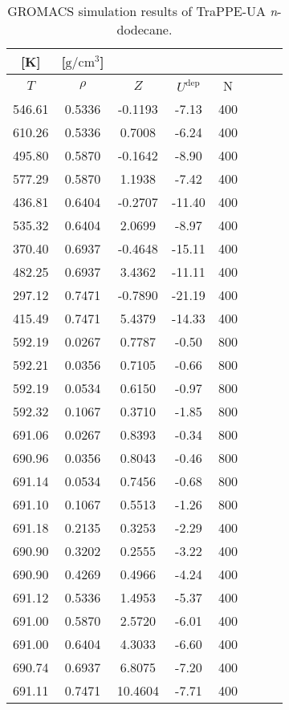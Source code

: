 \documentclass[%
 aip,
 jcp,
 sd,%
 amsmath,amssymb,
]{revtex4-1}
\begin{document}
\begin{table*}[!htbp]
\centering
\caption{GROMACS simulation results of TraPPE-UA \textit{n}-dodecane.}
\label{tab:sim-res-TraPPE-C12-gmx}
\begin{ruledtabular}
\begin{tabular}{cccccccc}
[K] & [$\mathrm{g/cm^3}$] &  &  & \\
\hline
$T$ & $\rho$ & $Z$ & $U^{\mathrm{dep}}$ & N\\
\hline
546.61	&	0.5336	&	-0.1193	&	-7.13	&	400	\\
610.26	&	0.5336	&	0.7008	&	-6.24	&	400	\\
495.80	&	0.5870	&	-0.1642	&	-8.90	&	400	\\
577.29	&	0.5870	&	1.1938	&	-7.42	&	400	\\
436.81	&	0.6404	&	-0.2707	&	-11.40	&	400	\\
535.32	&	0.6404	&	2.0699	&	-8.97	&	400	\\
370.40	&	0.6937	&	-0.4648	&	-15.11	&	400	\\
482.25	&	0.6937	&	3.4362	&	-11.11	&	400	\\
297.12	&	0.7471	&	-0.7890	&	-21.19	&	400	\\
415.49	&	0.7471	&	5.4379	&	-14.33	&	400	\\
592.19	&	0.0267	&	0.7787	&	-0.50	&	800	\\
592.21	&	0.0356	&	0.7105	&	-0.66	&	800	\\
592.19	&	0.0534	&	0.6150	&	-0.97	&	800	\\
592.32	&	0.1067	&	0.3710	&	-1.85	&	800	\\
691.06	&	0.0267	&	0.8393	&	-0.34	&	800	\\
690.96	&	0.0356	&	0.8043	&	-0.46	&	800	\\
691.14	&	0.0534	&	0.7456	&	-0.68	&	800	\\
691.10	&	0.1067	&	0.5513	&	-1.26	&	800	\\
691.18	&	0.2135	&	0.3253	&	-2.29	&	400	\\
690.90	&	0.3202	&	0.2555	&	-3.22	&	400	\\
690.90	&	0.4269	&	0.4966	&	-4.24	&	400	\\
691.12	&	0.5336	&	1.4953	&	-5.37	&	400	\\
691.00	&	0.5870	&	2.5720	&	-6.01	&	400	\\
691.00	&	0.6404	&	4.3033	&	-6.60	&	400	\\
690.74	&	0.6937	&	6.8075	&	-7.20	&	400	\\
691.11	&	0.7471	&	10.4604	&	-7.71	&	400	\\
\end{tabular}
\end{ruledtabular}
\end{table*}
\end{document}
